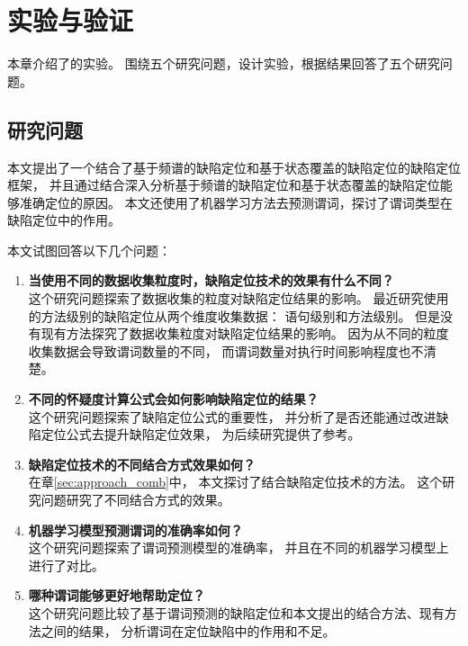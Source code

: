 \chapter{实验与验证}

本章介绍了\toolname{}的实验。
围绕五个研究问题，设计实验，根据结果回答了五个研究问题。

\section{研究问题}

本文提出了一个结合了基于频谱的缺陷定位和基于状态覆盖的缺陷定位的缺陷定位框架，
并且通过结合深入分析基于频谱的缺陷定位和基于状态覆盖的缺陷定位能够准确定位的原因。
本文还使用了机器学习方法去预测谓词，探讨了谓词类型在缺陷定位中的作用。

本文试图回答以下几个问题：
\begin{enumerate}
\item \textbf{当使用不同的数据收集粒度时，缺陷定位技术的效果有什么不同？} \\
这个研究问题探索了数据收集的粒度对缺陷定位结果的影响。
最近研究使用的方法级别的缺陷定位从两个维度收集数据：
语句级别和方法级别。
但是没有现有方法探究了数据收集粒度对缺陷定位结果的影响。
因为从不同的粒度收集数据会导致谓词数量的不同，
而谓词数量对执行时间影响程度也不清楚。
\item \textbf{不同的怀疑度计算公式会如何影响缺陷定位的结果？} \\
这个研究问题探索了缺陷定位公式的重要性，
并分析了是否还能通过改进缺陷定位公式去提升缺陷定位效果，
为后续研究提供了参考。
\item \textbf{缺陷定位技术的不同结合方式效果如何？} \\
在章\ref{sec:approach_comb}中，
本文探讨了结合缺陷定位技术的方法。
这个研究问题研究了不同结合方式的效果。
\item \textbf{机器学习模型预测谓词的准确率如何？} \\
这个研究问题探索了谓词预测模型的准确率，
并且在不同的机器学习模型上进行了对比。
\item \textbf{哪种谓词能够更好地帮助定位？} \\
这个研究问题比较了基于谓词预测的缺陷定位和本文提出的结合方法、现有方法之间的结果，
分析谓词在定位缺陷中的作用和不足。

\end{enumerate}

